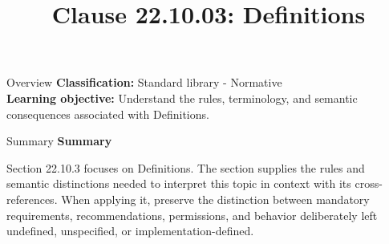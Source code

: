 \documentclass[10pt,letterpaper]{article}
\title{Clause 22.10.03: Definitions}
\author{}
\date{}
\begin{document}
\maketitle
\begin{CornellOverviewBox}{Overview}
\textbf{Classification:} Standard library - Normative\\[2pt]
\textbf{Learning objective:} Understand the rules, terminology, and semantic consequences associated with Definitions.
\end{CornellOverviewBox}\begin{CornellSummaryBox}{Summary}
{\sffamily\bfseries\color{Accent} Summary}\par\vspace{3pt}Section 22.10.3 focuses on Definitions. The section supplies the rules and semantic distinctions needed to interpret this topic in context with its cross-references. When applying it, preserve the distinction between mandatory requirements, recommendations, permissions, and behavior deliberately left undefined, unspecified, or implementation-defined.
\end{CornellSummaryBox}
\end{document}

